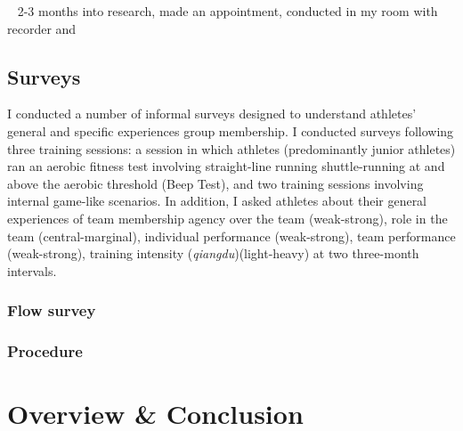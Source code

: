 {~ 2-3 months into research, made an appointment, conducted in my room with recorder and




  \subsection{Surveys}

     I conducted a number of informal surveys designed to understand athletes' general and specific experiences group membership.  I conducted surveys following three training sessions: a session in which athletes (predominantly junior athletes) ran an aerobic fitness test involving straight-line running shuttle-running at and above the aerobic threshold (Beep Test), and two training sessions involving internal game-like scenarios.  In addition, I asked athletes about their general experiences of team membership agency over the team (weak-strong), role in the team (central-marginal), individual performance (weak-strong), team performance (weak-strong), training intensity (\textit{qiangdu})(light-heavy) at two three-month intervals.

        \subsubsection{Flow survey}

    \subsubsection{Procedure} %





  \section{Overview & Conclusion}










}
